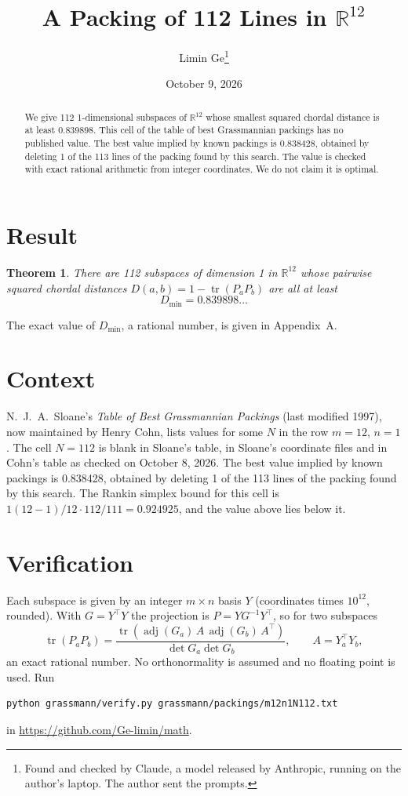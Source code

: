 \documentclass[11pt,a4paper]{article}
\title{A Packing of 112 Lines in $\mathbb{R}^{12}$}
\author{Limin Ge\thanks{Found and checked by Claude, a model released by Anthropic, running on the author's laptop. The author sent the prompts.}}
\date{October 9, 2026}
\newtheorem*{theorem}{Theorem}
\begin{document}
\maketitle
\begin{abstract}
We give 112 1-dimensional subspaces of $\mathbb{R}^{12}$ whose smallest squared chordal distance is at least 0.839898. This cell of the table of best Grassmannian packings has no published value. The best value implied by known packings is 0.838428, obtained by deleting 1 of the 113 lines of the packing found by this search. The value is checked with exact rational arithmetic from integer coordinates. We do not claim it is optimal.
\end{abstract}

\section{Result}
\begin{theorem}
There are 112 subspaces of dimension 1 in $\mathbb{R}^{12}$ whose pairwise squared chordal distances $D(a,b) = 1 - \operatorname{tr}(P_aP_b)$ are all at least
\[ D_{\min} = 0.839898\ldots \]
\end{theorem}
The exact value of $D_{\min}$, a rational number, is given in Appendix~A.


\section{Context}
N.~J.~A.~Sloane's \emph{Table of Best Grassmannian Packings} (last modified 1997), now maintained by Henry Cohn, lists values for some $N$ in the row $m=12$, $n=1$. The cell $N=112$ is blank in Sloane's table, in Sloane's coordinate files and in Cohn's table as checked on October 8, 2026. The best value implied by known packings is 0.838428, obtained by deleting 1 of the 113 lines of the packing found by this search. The Rankin simplex bound for this cell is $1(12-1)/12\cdot 112/111 = 0.924925$, and the value above lies below it.


\section{Verification}
Each subspace is given by an integer $m\times n$ basis $Y$ (coordinates times $10^{12}$, rounded). With $G=Y^\top Y$ the projection is $P=YG^{-1}Y^\top$, so for two subspaces
\[ \operatorname{tr}(P_aP_b)=\frac{\operatorname{tr}(\operatorname{adj}(G_a)\,A\,\operatorname{adj}(G_b)\,A^\top)}{\det G_a\det G_b},\qquad A=Y_a^\top Y_b, \]
an exact rational number. No orthonormality is assumed and no floating point is used. Run
\begin{verbatim}
python grassmann/verify.py grassmann/packings/m12n1N112.txt
\end{verbatim}
in \url{https://github.com/Ge-limin/math}.
\end{document}
